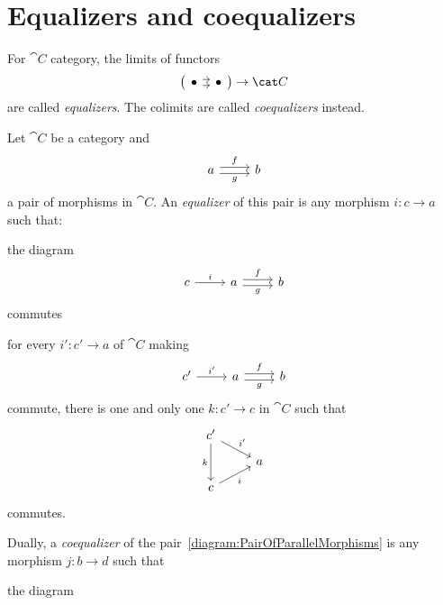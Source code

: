 
\section{Equalizers and coequalizers}

For \(\cat C\) category, the limits of functors
\[\left(\begin{tikzcd}[column sep=tiny] \bullet \ar[r, shift left] \ar[r, shift right] & \bullet \end{tikzcd}\right) \to \cat C\]
are called {\em equalizers}. The colimits are called {\em coequalizers} instead.

\begin{definition}
Let \(\cat C\) be a category and
\begin{equation}\begin{tikzcd}
a \ar["f", r, shift left] \ar["g", r, shift right, swap] & b
\end{tikzcd}\label{diagram:PairOfParallelMorphisms}\end{equation}
a pair of morphisms in \(\cat C\). An {\em equalizer} of this pair is any morphism \(i : c \to a\) such that:
\begin{tcbitem}
\item the diagram 
\[\begin{tikzcd}
c \ar["i", r] & a \ar["f", r, shift left] \ar["g", r, shift right, swap] & b
\end{tikzcd}\]
commutes
\item for every \(i' : c' \to a\) of \(\cat C\) making
\[\begin{tikzcd}
c' \ar["{i'}", r] & a \ar["f", r, shift left] \ar["g", r, shift right, swap] & b
\end{tikzcd}\]
commute, there is one and only one \(k : c' \to c\) in \(\cat C\) such that
\[\begin{tikzcd}[row sep=small]
c' \ar["{i'}", dr] \ar["k", dd, swap] \\
& a \\
c \ar["i", ur, swap]
\end{tikzcd}\]
commutes.
\end{tcbitem}
%
Dually, a {\em coequalizer} of the pair~\eqref{diagram:PairOfParallelMorphisms} is any morphism \(j : b \to d\) such that
\begin{tcbitem}
\item the diagram 
\[\begin{tikzcd}

\end{tikzcd}\]
\end{tcbitem}
\end{definition}
